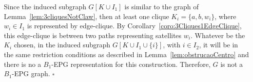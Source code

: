 \documentclass[9pt]{entcs}
\newtheorem{lema}{Lemma}[section]
\newtheorem{defi}{Definition}[section]
\begin{document}
\begin{pf}
Since the induced subgraph $G[K\cup I_1]$ is similar to the graph of Lemma~\ref{lem:3cliquesNotClaw}, then at least one clique $K_i = \{a,b,w_i\}$, where $w_i \in I_1$ is represented by edge-clique. By Corollary~\ref{coro:3Cliques1EdgeClique}, this edge-clique is between two paths representing satellites $w_i$. Whatever be the $K_i$ chosen, in the induced subgraph $G[K\cup I_1 \cup \{i\}]$, with $i\in I_2$, it will be in the same restriction conditions as described in Lemma~\ref{lem:obstrucaoCentro} and there is no a $B_1$-EPG representation for this construction. Therefore, $G$ is not a  $B_1$-EPG graph.
 $\square$\end{pf}





%

\end{document}
